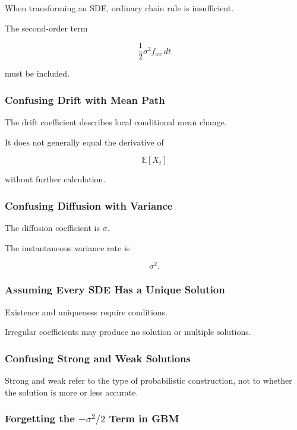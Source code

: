 When transforming an SDE, ordinary chain rule is insufficient.

The second-order term

\[
\frac12
\sigma^2f_{xx}\,dt
\]

must be included.

\subsubsection{Confusing Drift with Mean Path}

The drift coefficient describes local conditional mean change.

It does not generally equal the derivative of

\[
\mathbb{E}[X_t]
\]

without further calculation.

\subsubsection{Confusing Diffusion with Variance}

The diffusion coefficient is \(\sigma\).

The instantaneous variance rate is

\[
\boxed{
\sigma^2.
}
\]

\subsubsection{Assuming Every SDE Has a Unique Solution}

Existence and uniqueness require conditions.

Irregular coefficients may produce no solution or multiple solutions.

\subsubsection{Confusing Strong and Weak Solutions}

Strong and weak refer to the type of probabilistic construction, not to
whether the solution is more or less accurate.

\subsubsection{Forgetting the \(-\sigma^2/2\) Term in GBM}

